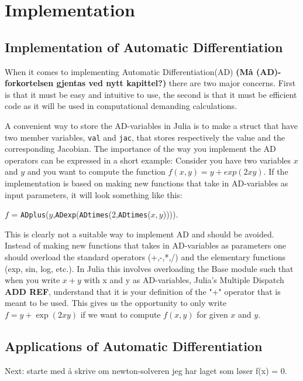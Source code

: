 \chapter{Implementation}
\section{Implementation of Automatic Differentiation}
When it comes to implementing Automatic Differentiation(AD) \textbf{(Må (AD)-forkortelsen gjentas ved nytt kapittel?)} there are two major concerns. First is that it must be easy and intuitive to use, the second is that it must be efficient code as it will be used in computational demanding calculations. 

A convenient way to store the AD-variables in Julia is to make a struct that have two member variables, \texttt{val} and \texttt{jac}, that stores respectively the value and the corresponding Jacobian. The importance of the way you implement the AD operators can be expressed in a short example: Consider you have two variables $x$ and $y$ and you want to compute the function $f(x,y) = y+exp(2xy)$. If the implementation is based on making new functions that take in AD-variables as input parameters, it will look something like this: 
\begin{center}
    $f$ = \texttt{ADplus}($y$,\texttt{ADexp}(\texttt{ADtimes}(2,\texttt{ADtimes}($x,y$)))).
\end{center}
This is clearly not a suitable way to implement AD and should be avoided. Instead of making new functions that takes in AD-variables as parameters one should overload the standard operators (+,-,*,/) and the elementary functions (exp, sin, log, etc.). In Julia this involves overloading the Base module such that when you write $x+y$ with x and y as AD-variables, Julia's Multiple Dispatch \textbf{ADD REF}, understand that it is your definition of the "+" operator that is meant to be used. This gives us the opportunity to only write $f = y+\exp(2xy)$ if we want to compute $f(x,y)$ for given $x$ and $y$. 

\section{Applications of Automatic Differentiation}
Next: starte med å skrive om newton-solveren jeg har laget som løser f(x) = 0.
